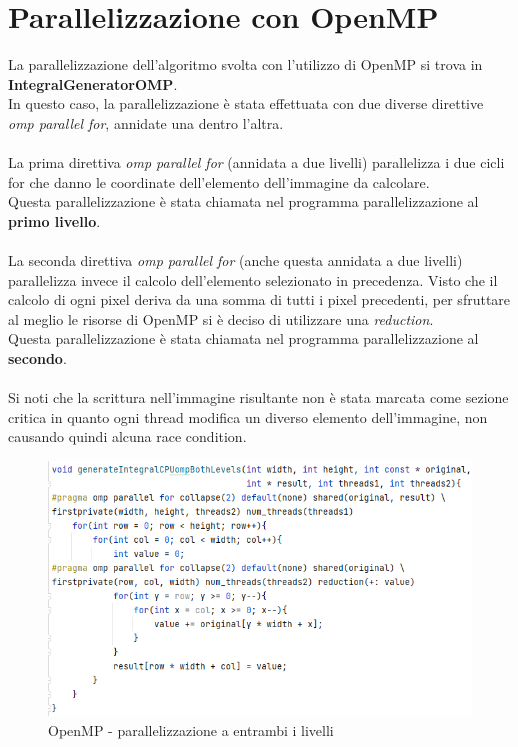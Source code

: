 \documentclass[10pt,twocolumn,letterpaper]{article}
\begin{document}
\section{Parallelizzazione con OpenMP}
La parallelizzazione dell’algoritmo svolta con l’utilizzo di OpenMP si trova in \textbf{IntegralGeneratorOMP}.\\
In questo caso, la parallelizzazione è stata effettuata con due diverse direttive \textit{omp parallel for}, annidate una dentro l'altra.\\
\\
La prima direttiva \textit{omp parallel for} (annidata a due livelli) parallelizza i due cicli for che danno le coordinate dell'elemento dell'immagine da calcolare.\\
Questa parallelizzazione è stata chiamata nel programma parallelizzazione al \textbf{primo livello}.\\
\\
La seconda direttiva \textit{omp parallel for} (anche questa annidata a due livelli) parallelizza invece il calcolo dell'elemento selezionato in precedenza. Visto che il calcolo di ogni pixel deriva da una somma di tutti i pixel precedenti, per sfruttare al meglio le risorse di OpenMP si è deciso di utilizzare una \textit{reduction}.\\
Questa parallelizzazione è stata chiamata nel programma parallelizzazione al \textbf{secondo}.\\
\\
Si noti che la scrittura nell'immagine risultante non è stata marcata come sezione critica in quanto ogni thread modifica un diverso elemento dell'immagine, non causando quindi alcuna race condition.\\
\begin{figure}[H]
\includegraphics[width=1\linewidth]{code/omp3.png} 
\caption{\small OpenMP - parallelizzazione a entrambi i livelli}
\label{ompcode}
\end{figure}
\end{document}
